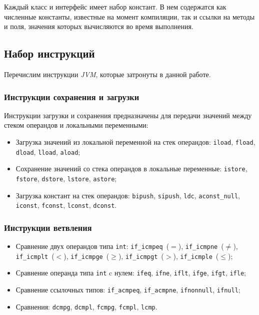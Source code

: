 Каждый класс и интерфейс имеет набор констант. В нем содержатся как численные константы, известные на момент компиляции, так и ссылки на методы и поля, 
значения которых вычисляются во время выполнения.

\subsection{Набор инструкций}
Перечислим инструкции \textit{JVM}, которые затронуты в данной работе. 

\subsubsection{Инструкции сохранения и загрузки}
Инструкции загрузки и сохранения предназначены для передачи значений между стеком операндов и локальными переменными:

\begin{itemize}
 \item Загрузка значений из локальной переменной на стек операндов: \texttt{iload}, \texttt{fload}, \texttt{dload}, \texttt{lload}, \texttt{aload};
 \item Сохранение значений со стека операндов в локальные переменные: \texttt{istore}, \texttt{fstore}, \texttt{dstore}, \texttt{lstore}, \texttt{astore};
 \item Загрузка констант на стек операндов: \texttt{bipush}, \texttt{sipush}, \texttt{ldc}, \texttt{aconst\_null}, \texttt{iconst}, \texttt{fconst}, 
\texttt{lconst}, \texttt{dconst}.
\end{itemize}

\subsubsection{Инструкции ветвления}
\begin{itemize}
 \item Сравнение двух операндов типа \texttt{int}: \texttt{if\_icmpeq}~($=$), \texttt{if\_icmpne}~($\neq$), \texttt{if\_icmplt}~($<$), 
\texttt{if\_icmpge}~($\ge$), \texttt{if\_icmpgt}~($>$), \texttt{if\_icmple}~($\le$);
 \item Сравнение операнда типа \texttt{int} c нулем: \texttt{ifeq}, \texttt{ifne}, \texttt{iflt}, \texttt{ifge}, \texttt{ifgt}, \texttt{ifle};
 \item Сравнение ссылочных типов: \texttt{if\_acmpeq}, \texttt{if\_acmpne}, \texttt{ifnonnull}, \texttt{ifnull};
 \item Сравнения: \texttt{dcmpg}, \texttt{dcmpl}, \texttt{fcmpg}, \texttt{fcmpl}, \texttt{lcmp}.
\end{itemize}


